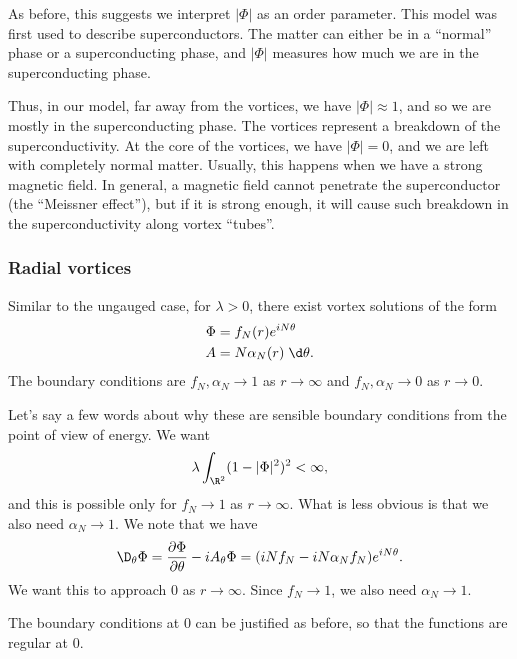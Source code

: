 \documentclass[a4paper]{article}
\begin{document}
As before, this suggests we interpret $|\Phi|$ as an order parameter. This model was first used to describe superconductors. The matter can either be in a ``normal'' phase or a superconducting phase, and $|\Phi|$ measures how much we are in the superconducting phase.

Thus, in our model, far away from the vortices, we have $|\Phi| \approx 1$, and so we are mostly in the superconducting phase. The vortices represent a breakdown of the superconductivity. At the core of the vortices, we have $|\Phi| = 0$, and we are left with completely normal matter. Usually, this happens when we have a strong magnetic field. In general, a magnetic field cannot penetrate the superconductor (the ``Meissner effect''), but if it is strong enough, it will cause such breakdown in the superconductivity along vortex ``tubes''.

\subsubsection*{Radial vortices}
Similar to the ungauged case, for $\lambda > 0$, there exist vortex solutions of the form
\begin{align*}
  \Phi &= f_N(r) e^{iN\theta}\\
  A &= N \alpha_N(r) \;\d \theta.
\end{align*}
The boundary conditions are $f_N, \alpha_N \to 1$ as $r \to \infty$ and $f_N, \alpha_N\to 0$ as $r \to 0$.

Let's say a few words about why these are sensible boundary conditions from the point of view of energy. We want
\[
  \lambda \int_{\R^2} (1 - |\Phi|^2)^2 < \infty,
\]
and this is possible only for $f_N \to 1$ as $r \to \infty$. What is less obvious is that we also need $\alpha_N \to 1$. We note that we have
\[
  \D_\theta \Phi = \frac{\partial \Phi}{\partial \theta} - i A_\theta \Phi = (iN f_N - iN \alpha_N f_N) e^{iN\theta}.
\]
We want this to approach $0$ as $r \to \infty$. Since $f_N \to 1$, we also need $\alpha_N \to 1$.

The boundary conditions at $0$ can be justified as before, so that the functions are regular at $0$.
\end{document}
